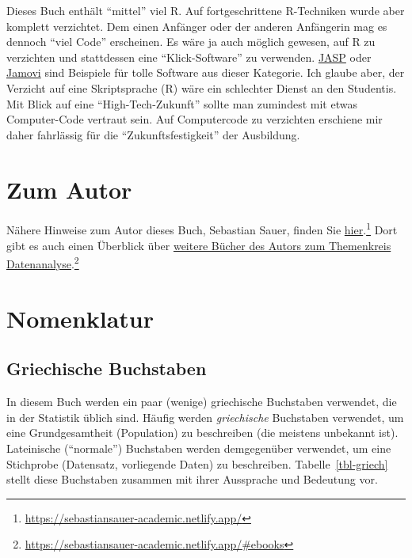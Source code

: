 \documentclass[
  a4paper,
  DIV=11]{scrreprt}
\theoremstyle{definition}
\theoremstyle{definition}
\theoremstyle{definition}
\theoremstyle{remark}
\begin{document}
Dieses Buch enthält ``mittel'' viel R. Auf fortgeschrittene R-Techniken
wurde aber komplett verzichtet. Dem einen Anfänger oder der anderen
Anfängerin mag es dennoch ``viel Code'' erscheinen. Es wäre ja auch
möglich gewesen, auf R zu verzichten und stattdessen eine
``Klick-Software'' zu verwenden. \href{https://jasp-stats.org/}{JASP}
oder \href{https://www.jamovi.org/}{Jamovi} sind Beispiele für tolle
Software aus dieser Kategorie. Ich glaube aber, der Verzicht auf eine
Skriptsprache (R) wäre ein schlechter Dienst an den Studentis. Mit Blick
auf eine ``High-Tech-Zukunft'' sollte man zumindest mit etwas
Computer-Code vertraut sein. Auf Computercode zu verzichten erschiene
mir daher fahrlässig für die ``Zukunftsfestigkeit'' der Ausbildung.

\section{Zum Autor}\label{zum-autor}

Nähere Hinweise zum Autor dieses Buch, Sebastian Sauer, finden Sie
\href{https://sebastiansauer-academic.netlify.app/}{hier}.\footnote{\url{https://sebastiansauer-academic.netlify.app/}}
Dort gibt es auch einen Überblick über
\href{https://sebastiansauer-academic.netlify.app/\#ebooks}{weitere
Bücher des Autors zum Themenkreis Datenanalyse}.\footnote{\url{https://sebastiansauer-academic.netlify.app/\#ebooks}}

\section{Nomenklatur}\label{nomenklatur}

\subsection{Griechische Buchstaben}\label{sec-greek}

In diesem Buch werden ein paar (wenige) griechische Buchstaben
verwendet, die in der Statistik üblich sind. Häufig werden
\emph{griechische} Buchstaben verwendet, um eine Grundgesamtheit
(Population) zu beschreiben (die meistens unbekannt ist). Lateinische
(``normale'') Buchstaben werden demgegenüber verwendet, um eine
Stichprobe (Datensatz, vorliegende Daten) zu beschreiben.
Tabelle~\ref{tbl-griech} stellt diese Buchstaben zusammen mit ihrer
Aussprache und Bedeutung vor.
\end{document}
